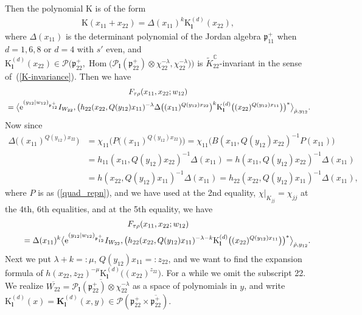 \documentclass[pdftex]{sigma}
\numberwithin{equation}{section}
\newcommand{\bK}{\mathbf{K}}
\newcommand{\bl}{\mathbf{l}}
\newcommand{\BC}{\mathbb{C}}
\newcommand{\fp}{\mathfrak{p}}
\newcommand{\cP}{\mathcal{P}}
\newcommand{\rK}{\mathrm{K}}
\newcommand{\Hom}{\operatorname{Hom}}
\begin{document}
Then the polynomial $\mathrm{K}$ is of the form
\begin{gather*} \rK(x_{11}+x_{22})=\Delta(x_{11})^k\rK_\bl^{(d)}(x_{22}), \end{gather*}
where $\Delta(x_{11})$ is the determinant polynomial of the Jordan algebra $\fp^+_{11}$ when $d=1,6,8$ or $d=4$ with $s'$ even,
and $\rK_\bl^{(d)}(x_{22})\in\cP\big(\fp^+_{22},\Hom\big(\cP_{\bl}(\fp^+_{22})\otimes\chi^{-\lambda}_{22},\chi^{-\lambda}_{22}\big)\big)$ is
$\tilde{K}_{22}^\BC$-invariant in the sense of~(\ref{K-invariance}). Then we have
\begin{gather*}
 F_{\tau\rho}(x_{11},x_{22};w_{12})\\
{}= \big\langle {\rm e}^{(y_{12}|w_{12})_{\fp^+_{12}}}I_{W_{22}},\big(h_{22}(x_{22},Q(y_{12})x_{11})^{-\lambda}
\Delta\big((x_{11})^{Q(y_{12})x_{22}}\big)^k
\rK_\bl^{(d)}\big((x_{22})^{Q(y_{12})x_{11}}\big)\big)^*\big\rangle_{\hat{\rho},y_{12}}.
\end{gather*}
Now since
\begin{align*}
\Delta\big((x_{11})^{Q(y_{12})x_{22}}\big)&=\chi_{11}\big(P\big((x_{11})^{Q(y_{12})x_{22}}\big)\big)
=\chi_{11}\big(B(x_{11},Q(y_{12})x_{22})^{-1}P(x_{11})\big) \\
&=h_{11}(x_{11},Q(y_{12})x_{22})^{-1}\Delta(x_{11})=h(x_{11},Q(y_{12})x_{22})^{-1}\Delta(x_{11}) \\
&=h(x_{22},Q(y_{12})x_{11})^{-1}\Delta(x_{11})=h_{22}(x_{22},Q(y_{12})x_{11})^{-1}\Delta(x_{11}),
\end{align*}
where $P$ is as (\ref{quad_repn}), and we have used \cite[Part~V, Proposition III.3.1, (J6.1)]{FKKLR} at the 2nd equality,
$\chi|_{K_{jj}}=\chi_{jj}$ at the 4th, 6th equalities, and \cite[Part V, Propositions IV.3.4 and~IV.3.5]{FKKLR} at the 5th equality, we have
\begin{gather*}
 F_{\tau\rho}(x_{11},x_{22};w_{12})\\
\qquad{} =\Delta(x_{11})^k\bigl\langle {\rm e}^{(y_{12}|w_{12})_{\fp^+_{12}}}I_{W_{22}},
\big(h_{22}(x_{22},Q(y_{12})x_{11})^{-\lambda-k} \rK_\bl^{(d)}\big((x_{22})^{Q(y_{12})x_{11}}\big)\big)^*\bigr\rangle_{\hat{\rho},y_{12}}.
\end{gather*}
Next we put $\lambda+k=:\mu$, $Q(y_{12})x_{11}=:z_{22}$, and we want to find the expansion formula of $h(x_{22},z_{22})^{-\mu}\rK_\bl^{(d)}\big((x_{22})^{z_{22}}\big)$. For a while we omit the subscript 22. We realize $\overline{W_{22}}=\overline{\cP_\bl(\fp^+_{22})\otimes\chi_{22}^{-\lambda}}$ as a space of polynomials in $y$, and write $\rK_\bl^{(d)}(x)=\bK_\bl^{(d)}(x,y)\in\cP(\fp^+_{22}\times\overline{\fp^+_{22}})$.
\end{document}
